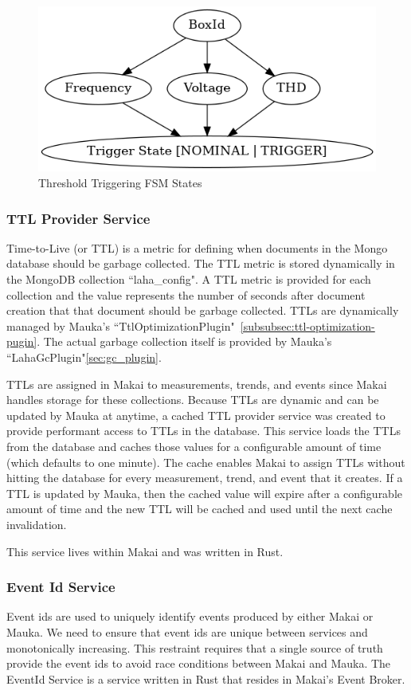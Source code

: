 \begin{figure}
	\centering
	\includegraphics[width=\linewidth]{figures/threshold_triggering.png}
	\caption{Threshold Triggering FSM States}
	\label{fig:threshold_triggering}
\end{figure}

\subsubsection{TTL Provider Service}
Time-to-Live (or TTL) is a metric for defining when documents in the Mongo database should be garbage collected. The TTL metric is stored dynamically in the MongoDB collection ``laha\_config". A TTL metric is provided for each collection and the value represents the number of seconds after document creation that that document should be garbage collected. TTLs are dynamically managed by Mauka's ``TtlOptimizationPlugin"~\ref{subsubsec:ttl-optimization-pugin}. The actual garbage collection itself is provided by Mauka's ``LahaGcPlugin"\ref{sec:gc_plugin}.

TTLs are assigned in Makai to measurements, trends, and events since Makai handles storage for these collections. Because TTLs are dynamic and can be updated by Mauka at anytime, a cached TTL provider service was created to provide performant access to TTLs in the database. This service loads the TTLs from the database and caches those values for a configurable amount of time (which defaults to one minute). The cache enables Makai to assign TTLs without hitting the database for every measurement, trend, and event that it creates. If a TTL is updated by Mauka, then the cached value will expire after a configurable amount of time and the new TTL will be cached and used until the next cache invalidation.

This service lives within Makai and was written in Rust.

\subsubsection{Event Id Service}
Event ids are used to uniquely identify events produced by either Makai or Mauka. We need to ensure that event ids are unique between services and monotonically increasing. This restraint requires that a single source of truth provide the event ids to avoid race conditions between Makai and Mauka. The EventId Service is a service written in Rust that resides in Makai's Event Broker.

